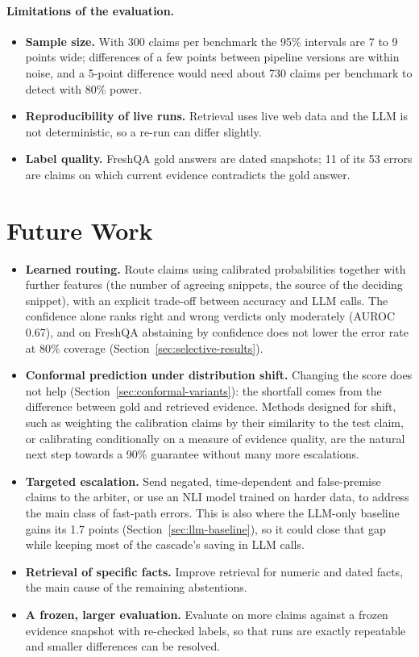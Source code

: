 \paragraph{Limitations of the evaluation.}
\begin{itemize}[itemsep=0.2em]
  \item \textbf{Sample size.} With 300 claims per benchmark the 95\% intervals are 7 to 9 points wide; differences of a few points between pipeline versions are within noise, and a 5-point difference would need about 730 claims per benchmark to detect with 80\% power.
  \item \textbf{Reproducibility of live runs.} Retrieval uses live web data and the LLM is not deterministic, so a re-run can differ slightly.
  \item \textbf{Label quality.} FreshQA gold answers are dated snapshots; 11 of its 53 errors are claims on which current evidence contradicts the gold answer.
\end{itemize}

\section{Future Work}

\begin{itemize}[itemsep=0.3em]
  \item \textbf{Learned routing.} Route claims using calibrated probabilities together with further features (the number of agreeing snippets, the source of the deciding snippet), with an explicit trade-off between accuracy and LLM calls. The confidence alone ranks right and wrong verdicts only moderately (AUROC 0.67), and on FreshQA abstaining by confidence does not lower the error rate at 80\% coverage (Section~\ref{sec:selective-results}).
  \item \textbf{Conformal prediction under distribution shift.} Changing the score does not help (Section~\ref{sec:conformal-variants}): the shortfall comes from the difference between gold and retrieved evidence. Methods designed for shift, such as weighting the calibration claims by their similarity to the test claim, or calibrating conditionally on a measure of evidence quality, are the natural next step towards a 90\% guarantee without many more escalations.
  \item \textbf{Targeted escalation.} Send negated, time-dependent and false-premise claims to the arbiter, or use an NLI model trained on harder data, to address the main class of fast-path errors. This is also where the LLM-only baseline gains its 1.7 points (Section~\ref{sec:llm-baseline}), so it could close that gap while keeping most of the cascade's saving in LLM calls.
  \item \textbf{Retrieval of specific facts.} Improve retrieval for numeric and dated facts, the main cause of the remaining abstentions.
  \item \textbf{A frozen, larger evaluation.} Evaluate on more claims against a frozen evidence snapshot with re-checked labels, so that runs are exactly repeatable and smaller differences can be resolved.
\end{itemize}
